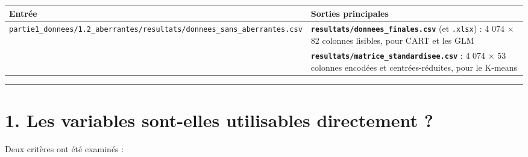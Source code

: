 \documentclass[

  french,

  10pt,

  a4paper,

]{article}
\newcounter{none} %
\begin{document}
{\def\LTcaptype{none} %

\begin{longtable}[]{@{}

  >{\raggedright\arraybackslash}p{}

  >{\raggedright\arraybackslash}p{}@{}}

\toprule\noalign{}

\begin{minipage}[b]{\linewidth}\raggedright

Entrée

\end{minipage} & \begin{minipage}[b]{\linewidth}\raggedright

Sorties principales

\end{minipage} \\

\midrule\noalign{}

\endhead

\bottomrule\noalign{}

\endlastfoot

\texttt{partie1\_donnees/1.2\_aberrantes/resultats/donnees\_sans\_aberrantes.csv} & \textbf{\texttt{resultats/donnees\_finales.csv}} (et \texttt{.xlsx}) : 4 074 \ensuremath{\times} 82 colonnes lisibles, pour CART et les GLM \\

& \textbf{\texttt{resultats/matrice\_standardisee.csv}} : 4 074 \ensuremath{\times} 53 colonnes encodées et centrées-réduites, pour le K-means \\

\end{longtable}

}



\begin{center}\rule{0.5\linewidth}{0.5pt}\end{center}



\section{1. Les variables sont-elles utilisables directement ?}



Deux critères ont été examinés :
\end{document}
